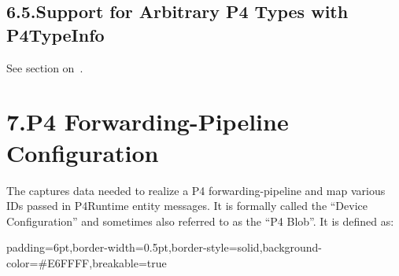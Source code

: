 \documentclass[11pt]{article}
\begin{document}
{%
\subsection{6.5.\hspace*{0.5em}Support for Arbitrary P4 Types with P4TypeInfo}\label{sec-support-for-arbitrary-p4-types-with-p4typeinfo}%

\noindent{}See section on~.%

\section{7.\hspace*{0.5em}P4 Forwarding-Pipeline Configuration}\label{sec-p4-fwd-pipe-config}%

\noindent{}The  captures data needed to realize a P4
forwarding-pipeline and map various IDs passed in P4Runtime entity messages. It
is formally called the \textquotedblleft{}Device Configuration\textquotedblright{} and sometimes also referred to as
the \textquotedblleft{}P4 Blob\textquotedblright{}. It is defined as:%

\begin{mdbmargintb}{6pt}{6pt}%
\begin{mdblock}{padding=6pt,border-width=0.5pt,border-style=solid,background-color=\#E6FFFF,breakable=true}%
\begin{mdpre}%
\end{mdpre}%
\end{mdblock}%
\end{mdbmargintb}%

}
\end{document}
